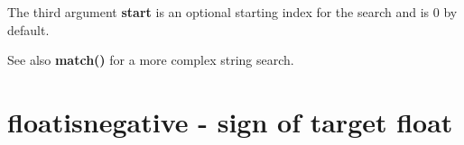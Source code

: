         The third argument {\bf start} is an optional starting index for the
        search and is 0 by default.

        
        See also {\bf match()}  for a more complex
        string search.




%        
%        
%        
%        
%
%        
%        
%        


    \section{floatisnegative - sign of target float}\label{sec:iffloatisnegative}
        
